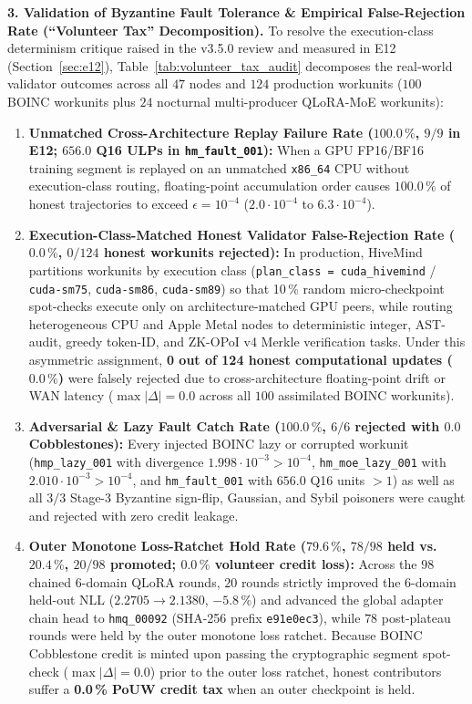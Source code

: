 \documentclass[11pt,a4paper]{article}
\begin{document}
\textbf{3. Validation of Byzantine Fault Tolerance \& Empirical False-Rejection Rate (``Volunteer Tax'' Decomposition).}
To resolve the execution-class determinism critique raised in the v3.5.0 review and measured in E12 (Section~\ref{sec:e12}), Table~\ref{tab:volunteer_tax_audit} decomposes the real-world validator outcomes across all $47$ nodes and $124$ production workunits ($100$ BOINC workunits plus $24$ nocturnal multi-producer QLoRA-MoE workunits):
\begin{enumerate}[leftmargin=1.8em]
    \item \textbf{Unmatched Cross-Architecture Replay Failure Rate ($\mathbf{100.0\,\%}$, $9/9$ in E12; $656.0$ Q16 ULPs in \texttt{hm\_fault\_001}):} When a GPU FP16/BF16 training segment is replayed on an unmatched \texttt{x86\_64} CPU without execution-class routing, floating-point accumulation order causes $100.0\,\%$ of honest trajectories to exceed $\epsilon = 10^{-4}$ ($2.0\cdot 10^{-4}$ to $6.3\cdot 10^{-4}$).
    \item \textbf{Execution-Class-Matched Honest Validator False-Rejection Rate ($\mathbf{0.0\,\%}$, $0/124$ honest workunits rejected):} In production, HiveMind partitions workunits by execution class (\texttt{plan\_class = cuda\_hivemind} / \texttt{cuda-sm75}, \texttt{cuda-sm86}, \texttt{cuda-sm89}) so that 10\,\% random micro-checkpoint spot-checks execute only on architecture-matched GPU peers, while routing heterogeneous CPU and Apple Metal nodes to deterministic integer, AST-audit, greedy token-ID, and ZK-OPoI v4 Merkle verification tasks. Under this asymmetric assignment, \textbf{0 out of 124 honest computational updates ($0.0\,\%$)} were falsely rejected due to cross-architecture floating-point drift or WAN latency ($\max|\Delta| = 0.0$ across all $100$ assimilated BOINC workunits).
    \item \textbf{Adversarial \& Lazy Fault Catch Rate ($\mathbf{100.0\,\%}$, $6/6$ rejected with $0.0$ Cobblestones):} Every injected BOINC lazy or corrupted workunit (\texttt{hmp\_lazy\_001} with divergence $1.998\cdot 10^{-3} > 10^{-4}$, \texttt{hm\_moe\_lazy\_001} with $2.010\cdot 10^{-3} > 10^{-4}$, and \texttt{hm\_fault\_001} with $656.0$ Q16 units $> 1$) as well as all $3/3$ Stage-3 Byzantine sign-flip, Gaussian, and Sybil poisoners were caught and rejected with zero credit leakage.
    \item \textbf{Outer Monotone Loss-Ratchet Hold Rate ($\mathbf{79.6\,\%}$, $78/98$ held vs.\ $\mathbf{20.4\,\%}$, $20/98$ promoted; $\mathbf{0.0\,\%}$ volunteer credit loss):} Across the $98$ chained 6-domain QLoRA rounds, $20$ rounds strictly improved the 6-domain held-out NLL ($2.2705 \to 2.1380$, $-5.8\,\%$) and advanced the global adapter chain head to \texttt{hmq\_00092} (SHA-256 prefix \texttt{e91e0ec3}), while $78$ post-plateau rounds were held by the outer monotone loss ratchet. Because BOINC Cobblestone credit is minted upon passing the cryptographic segment spot-check ($\max|\Delta| = 0.0$) prior to the outer loss ratchet, honest contributors suffer a \textbf{0.0\,\% PoUW credit tax} when an outer checkpoint is held.
\end{enumerate}
\end{document}
